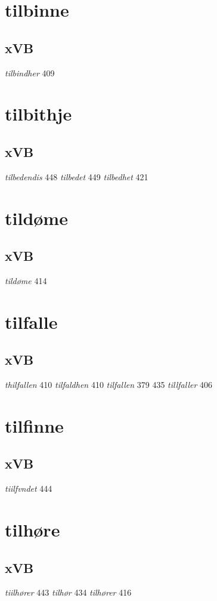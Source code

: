 \documentclass[a4paper,twocolumn]{article}
\begin{document}
\section{tilbinne}
\label{sec:org3e1f437}
\subsection{xVB}
\label{sec:org8847186}
\emph{tilbindher} 409 
\section{tilbithje}
\label{sec:orgaea6ebd}
\subsection{xVB}
\label{sec:org91376f4}
\emph{tilbedendis} 448 \emph{tilbedet} 449 \emph{tilbedhet} 421 
\section{tildøme}
\label{sec:org45bfcbf}
\subsection{xVB}
\label{sec:org68ee2c3}
\emph{tildøme} 414 
\section{tilfalle}
\label{sec:org2291c66}
\subsection{xVB}
\label{sec:org925819b}
\emph{thilfallen} 410 \emph{tilfaldhen} 410 \emph{tilfallen} 379 435 \emph{tillfaller} 406 
\section{tilfinne}
\label{sec:org17b1e78}
\subsection{xVB}
\label{sec:orgc09e135}
\emph{tiilfvndet} 444 
\section{tilhøre}
\label{sec:orgc964d8a}
\subsection{xVB}
\label{sec:orge759f09}
\emph{tiilhører} 443 \emph{tilhør} 434 \emph{tilhører} 416 
\end{document}
